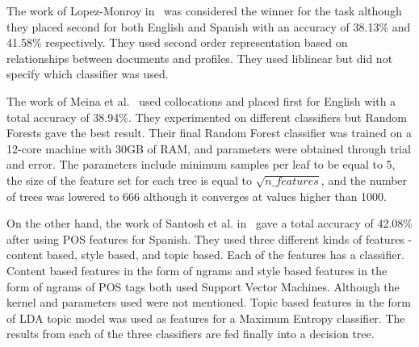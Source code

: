 \documentclass[a4paper]{llncs}
\begin{document}
The work of Lopez-Monroy in~\cite{lopez2013inaoe} was considered the winner for the task although they placed second for both English and Spanish with an accuracy of 38.13\% and 41.58\% respectively. They used second order representation based on relationships between documents and profiles. They used liblinear but did not specify which classifier was used.  

The work of Meina et al.~\cite{meina2013ensemble} used collocations and placed first for English with a total accuracy of 38.94\%. They experimented on different classifiers but Random Forests gave the best result. Their final Random Forest classifier was trained on a 12-core machine with 30GB of RAM, and parameters were obtained through trial and error. The parameters include minimum samples per leaf to be equal to 5, the size of the feature set for each tree is equal to $\sqrt{n\_features}$, and the number of trees was lowered to 666 although it converges at values higher than 1000.  


On the other hand, the work of Santosh et al. in~\cite{santosh2013author} gave a total accuracy of 42.08\% after using POS features for Spanish. They used three different kinds of features - content based, style based, and topic based. Each of the features has a classifier. Content based features in the form of ngrams and style based features in the form of ngrams of POS tags both used Support Vector Machines. Although the kernel and parameters used were not mentioned. Topic based features in the form of LDA topic model was used as features for a Maximum Entropy classifier. The results from each of the three classifiers are fed finally into a decision tree. 
\end{document}
